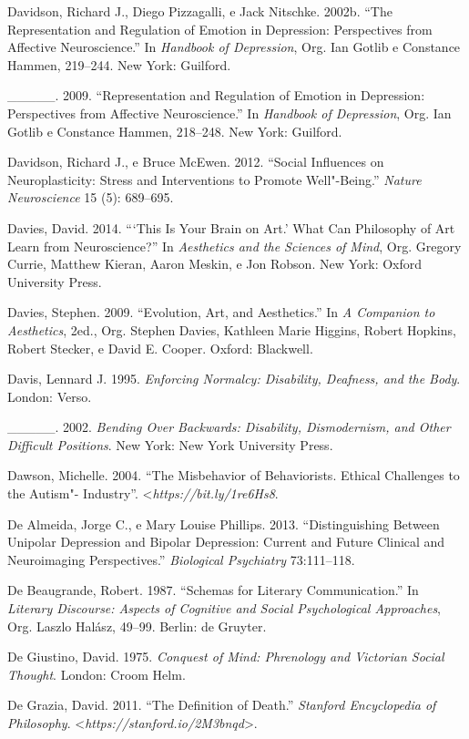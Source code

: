 {\begin{Parskip}
Davidson, Richard J., Diego Pizzagalli, e Jack Nitschke. 2002b. ``The
Representation and Regulation of Emotion in Depression: Perspectives
from Affective Neuroscience.'' In \emph{Handbook of Depression}, Org.
Ian Gotlib e Constance Hammen, 219--244. New York: Guilford.

\_\_\_\_\_. 2009. ``Representation and Regulation of Emotion in
Depression: Perspectives from Affective Neuroscience.'' In
\emph{Handbook of Depression}, Org. Ian Gotlib e Constance Hammen,
218--248. New York: Guilford.

Davidson, Richard J., e Bruce McEwen. 2012. ``Social Influences on
Neuroplasticity: Stress and Interventions to Promote Well"-Being.''
\emph{Nature Neuroscience} 15 (5): 689--695.

Davies, David. 2014. ```This Is Your Brain on Art.' What Can Philosophy
of Art Learn from Neuroscience?'' In \emph{Aesthetics and the Sciences
of Mind}, Org. Gregory Currie, Matthew Kieran, Aaron Meskin, e Jon
Robson. New York: Oxford University Press.

Davies, Stephen. 2009. ``Evolution, Art, and Aesthetics.'' In \emph{A
Companion to Aesthetics}, 2ed., Org. Stephen Davies, Kathleen Marie
Higgins, Robert Hopkins, Robert Stecker, e David E. Cooper. Oxford:
Blackwell.

Davis, Lennard J. 1995. \emph{Enforcing Normalcy: Disability, Deafness,
and the Body}. London: Verso.

\_\_\_\_\_. 2002. \emph{Bending Over Backwards: Disability, Dismodernism,
and Other Difficult Positions}. New York: New York University Press.

Dawson, Michelle. 2004. ``The Misbehavior of Behaviorists. Ethical
Challenges to the Autism"- Industry''.
\textless{}\emph{https://bit.ly/1re6Hs8}.

De Almeida, Jorge C., e Mary Louise Phillips. 2013. ``Distinguishing
Between Unipolar Depression and Bipolar Depression: Current and Future
Clinical and Neuroimaging Perspectives.'' \emph{Biological Psychiatry}
73:111--118.

De Beaugrande, Robert. 1987. ``Schemas for Literary Communication.'' In
\emph{Literary Discourse: Aspects of Cognitive and Social Psychological
Approaches}, Org. Laszlo Halász, 49--99. Berlin: de Gruyter.

De Giustino, David. 1975. \emph{Conquest of Mind: Phrenology and
Victorian Social Thought}. London: Croom Helm.

De Grazia, David. 2011. ``The Definition of Death.'' \emph{Stanford
Encyclopedia of Philosophy}.
\textless{}\emph{https://stanford.io/2M3bnqd}\textgreater{}.


\end{Parskip}}
